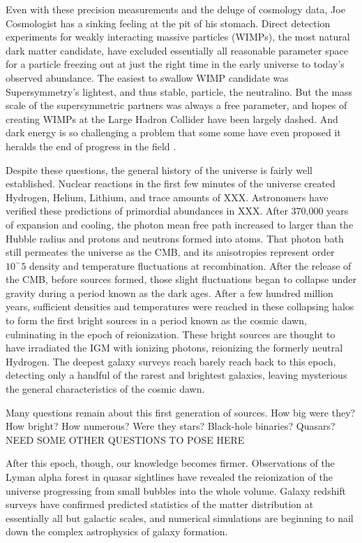 Even with these precision measurements and the deluge of cosmology data, Joe Cosmologist has a sinking feeling at the pit of his stomach. Direct detection experiments for weakly interacting massive particles (WIMPs), the most natural dark matter candidate, have excluded essentially all reasonable parameter space for a particle freezing out at just the right time in the early universe to today's observed abundance. The easiest to swallow WIMP candidate was Supersymmetry's lightest, and thus stable, particle, the neutralino. But the mass scale of the supersymmetric partners was always a free parameter, and hopes of creating WIMPs at the Large Hadron Collider have been largely dashed. And dark energy is so challenging a problem that some some have even proposed it heralds the end of progress in the field \citep{darkenergybad}. 

Despite these questions, the general history of the universe is fairly well established. Nuclear reactions in the first few minutes of the universe created Hydrogen, Helium, Lithium, and trace amounts of XXX. Astronomers have verified these predictions of primordial abundances in XXX. After 370,000 years of expansion and cooling, the photon mean free path increased to larger than the Hubble radius and protons and neutrons formed into atoms. That photon bath still permeates the universe as the CMB, and its anisotropies represent order $10^-5$ density and temperature fluctuations at recombination. After the release of the CMB, before sources formed, those slight fluctuations began to collapse under gravity during a period known as the dark ages. After a few hundred million years, sufficient densities and temperatures were reached in these collapsing halos to form the first bright sources in a period known as the cosmic dawn, culminating in the epoch of reionization. These bright sources are thought to have irradiated the IGM with ionizing photons, reionizing the formerly neutral Hydrogen. The deepest galaxy surveys reach barely reach back to this epoch, detecting only a handful of the rarest and brightest galaxies, leaving mysterious the general characteristics of the cosmic dawn.

Many questions remain about this first generation of sources. How big were they? How bright? How numerous? Were they stars? Black-hole binaries? Quasars? NEED SOME OTHER QUESTIONS TO POSE HERE

After this epoch, though, our knowledge becomes firmer. Observations of the Lyman alpha forest in quasar sightlines have revealed the reionization of the universe progressing from small bubbles into the whole volume. Galaxy redshift surveys have confirmed predicted statistics of the matter distribution at essentially all but galactic scales, and numerical simulations are beginning to nail down the complex astrophysics of galaxy formation.

